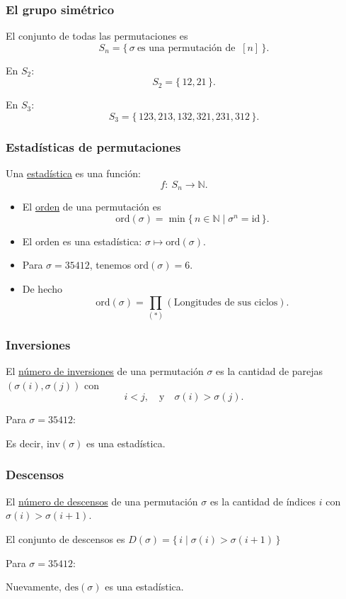 \documentclass[grey]{beamer}
\newcommand{\sg}{\sigma}
\newcommand{\set}[1]{\{\,#1\,\}}    %
\newcommand{\bN}{\mathbb{N}}
\newcommand{\ord}{\text{ord}}
\newcommand{\inv}{\text{inv}}
\newcommand{\des}{\text{des}}
\begin{document}
\begin{frame}[t]\frametitle{El grupo simétrico}
  \begin{definition}
    El conjunto de todas las permutaciones es 
    $$S_n=\set{\sg\ \text{es una permutación de }\ [n]}.$$
  \end{definition}\pause
  \begin{example}
    En $S_2$: 
    $$S_2=\set{12,21}.$$
  \end{example}\pause 
  \begin{example}
    En $S_3$: 
    $$S_3=\set{123,213,132,321,231,312}.$$
  \end{example} 
\end{frame}

\begin{frame}[t]\frametitle{Estadísticas de permutaciones}
  \begin{definition}
    Una \underline{estadística} es una función: 
    $$f:\ S_n\to\bN.$$
  \end{definition}\pause
  \begin{itemize}[<+->]
    \item El \underline{orden} de una permutación es 
    $$\ord(\sg)=\min\set{n\in\bN\mid \sg^n=\text{id}}.$$
    \item El orden es una estadística: $\sg\mapsto\ord(\sg)$.
    \item Para $\sg=35412$, tenemos $\ord(\sg)=6$.
    \item De hecho 
    $$\ord(\sg)=\prod_{(\ast)}(\text{Longitudes de sus ciclos}).$$
  \end{itemize}
    
\end{frame}

\begin{frame}[t]\frametitle{Inversiones}
  \begin{definition}
    El \underline{número de inversiones} de una permutación $\sg$ es la cantidad de parejas $(\sg(i),\sg(j))$ con 
    $$i<j,\quad\text{y}\quad\sg(i)>\sg(j).$$
  \end{definition}\pause
  Para $\sg=35412$:\par
  \vspace{7em}\pause
  Es decir, $\inv(\sg)$ es una estadística.
\end{frame}

\begin{frame}[t]\frametitle{Descensos}
  \begin{definition}
    El \underline{número de descensos} de una permutación $\sg$ es la cantidad de índices $i$ con $\sg(i)>\sg(i+1)$.\par 
    El conjunto de descensos es $D(\sg)=\set{i\mid \sg(i)>\sg(i+1)}$
  \end{definition}\pause
  Para $\sg=35412$:\par
  \vspace{7em}\pause
  Nuevamente, $\des(\sg)$ es una estadística.
\end{frame}
\end{document}
